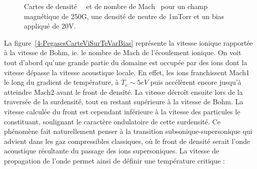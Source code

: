 \begin{refsection}
\begin{figure}[htbp] 
  \centering
    \caption{Cartes de densité~~ et de
    nombre de Mach~ pour un champ
    magnétique de 250G, une densité de neutre de 1mTorr et un bias appliqué de
    20V.}
    \label{4-PegasesVaguesIoniques}
\end{figure}
 
 La figure~\ref{4-PegasesCarteViSurTeVarBias} représente la vitesse ionique
 rapportée à la vitesse de Bohm, ie. le nombre de Mach de
 l'écoulement ionique. On voit tout d'abord qu'une grande partie du domaine est
 occupée par des ions dont la vitesse dépasse la vitesse acoustique locale. En
 effet, les ions franchissent Mach1 le long du gradient de température, à
 $T_e\sim 5eV$ puis accélèrent encore jusqu'à atteindre Mach2 avant le front de
 densité. La vitesse décroît ensuite lors de la traversée de la surdensité, tout
 en restant supérieure à la vitesse de Bohm. La vitesse calculée du
 front est cependant inférieure à la vitesse des particules le constituant,
 soulignant le caractère ondulatoire de cette surdensité. Ce phénomène fait
 naturellement penser à la transition subsonique-supersonique qui advient dans
 les gaz compressibles classiques, où le front de densité serait l'onde
 acoustique résultante du passage des ions supersoniques. La vitesse de
 propagation de l'onde permet ainsi de définir une température critique :
 

\end{refsection}
